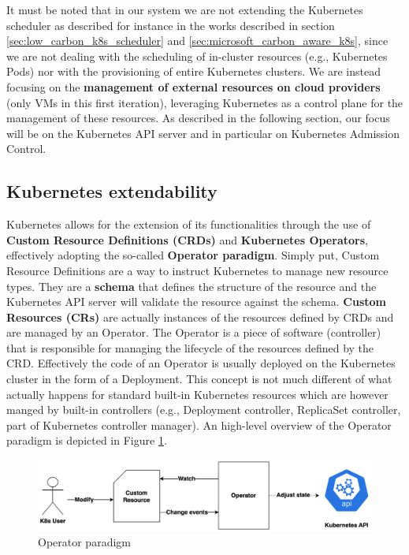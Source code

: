 It must be noted that in our system we are not extending the Kubernetes scheduler as described for instance in the works described in section \ref{sec:low_carbon_k8s_scheduler} and \ref{sec:microsoft_carbon_aware_k8s}, since we are not dealing with the scheduling of in-cluster resources (e.g., Kubernetes Pods) nor with the provisioning of entire Kubernetes clusters.
We are instead focusing on the \textbf{management of external resources on cloud providers} (only VMs in this first iteration), leveraging Kubernetes as a control plane for the management of these resources.
As described in the following section, our focus will be on the Kubernetes API server and in particular on Kubernetes Admission Control.

\subsection{Kubernetes extendability}


Kubernetes allows for the extension of its functionalities through the use of \textbf{Custom Resource Definitions (CRDs)} and \textbf{Kubernetes Operators}, effectively adopting the so-called \textbf{Operator paradigm}.
Simply put, Custom Resource Definitions are a way to instruct Kubernetes to manage new resource types. 
They are a \textbf{schema} that defines the structure of the resource and the Kubernetes API server will validate the resource against the schema.
\textbf{Custom Resources (CRs)} are actually instances of the resources defined by CRDs and are managed by an Operator.
The Operator is a piece of software (controller) that is responsible for managing the lifecycle of the resources defined by the CRD.
Effectively the code of an Operator is usually deployed on the Kubernetes cluster in the form of a Deployment.
This concept is not much different of what actually happens for standard built-in Kubernetes resources which are however manged by built-in controllers (e.g., Deployment controller, ReplicaSet controller, part of Kubernetes controller manager).
An high-level overview of the Operator paradigm is depicted in Figure \ref{fig:operator_paradigm}.

\begin{figure}[H]
    \centering
    \includegraphics[width=1\linewidth]{images/opeartor_paradigm.png}
    \caption{Operator paradigm}
    \label{fig:operator_paradigm}
\end{figure}

